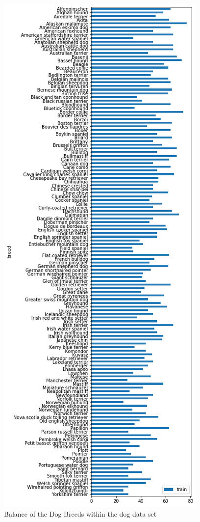 \documentclass[paper=A4, DIV=10, parskip=half]{scrartcl}
\begin{document}
\begin{figure}
  \centering
  \includegraphics[height=0.95\textheight]{images/dog_train_balance.png}
  \caption{Balance of the Dog Breeds within the dog data set}
  \label{dog_train_balance}
\end{figure}
\end{document}
